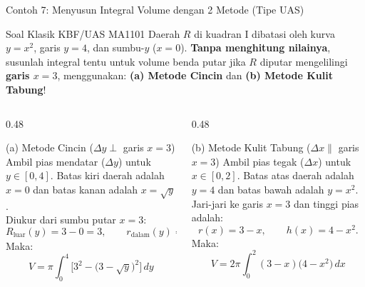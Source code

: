 \documentclass[aspectratio=43,10pt]{beamer}
\begin{document}
\begin{frame}{Contoh 7: Menyusun Integral Volume dengan 2 Metode (Tipe UAS)}
    \begin{exampleblock}{Soal Klasik KBF/UAS MA1101}
        \scriptsize
        Daerah $R$ di kuadran I dibatasi oleh kurva $y = x^2$, garis $y = 4$, dan sumbu-$y$ ($x = 0$). \textbf{Tanpa menghitung nilainya}, susunlah integral tentu untuk volume benda putar jika $R$ diputar mengelilingi \textbf{garis $x = 3$}, menggunakan: \textbf{(a) Metode Cincin} dan \textbf{(b) Metode Kulit Tabung}!
    \end{exampleblock}

    \begin{columns}[T]
        \begin{column}{0.48\textwidth}
            \begin{block}{(a) Metode Cincin ($\Delta y \perp$ garis $x = 3$)}
                \scriptsize\abovedisplayskip=2pt\belowdisplayskip=2pt
                Ambil pias mendatar ($\Delta y$) untuk $y \in [0, 4]$. Batas kiri daerah adalah $x = 0$ dan batas kanan adalah $x = \sqrt{y}$.\\
                Diukur dari sumbu putar $x = 3$:
                $$R_{\text{luar}}(y) = 3 - 0 = 3, \qquad r_{\text{dalam}}(y) = 3 - \sqrt{y}.$$
                Maka:
                $$\boxed{V = \pi\int_{0}^{4} \Big[3^2 - \big(3 - \sqrt{y}\big)^2\Big]\,dy}$$
            \end{block}
        \end{column}

        \begin{column}{0.48\textwidth}
            \begin{alertblock}{(b) Metode Kulit Tabung ($\Delta x \parallel$ garis $x = 3$)}
                \scriptsize\abovedisplayskip=2pt\belowdisplayskip=2pt
                Ambil pias tegak ($\Delta x$) untuk $x \in [0, 2]$. Batas atas daerah adalah $y = 4$ dan batas bawah adalah $y = x^2$.\\
                Jari-jari ke garis $x = 3$ dan tinggi pias adalah:
                $$r(x) = 3 - x, \qquad h(x) = 4 - x^2.$$
                Maka:
                $$\boxed{V = 2\pi\int_{0}^{2} (3 - x)\big(4 - x^2\big)\,dx}$$
            \end{alertblock}
        \end{column}
    \end{columns}
\end{frame}
\end{document}
